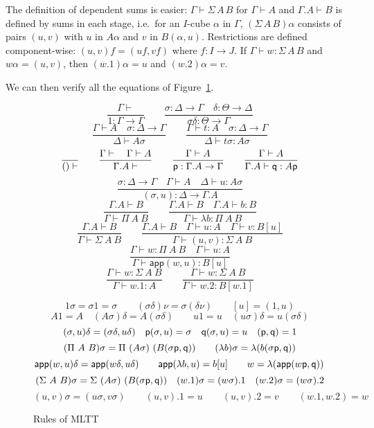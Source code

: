 \documentclass[a4paper,USenglish,draft]{lipics}
\newcommand{\app}{\mathsf{app}}
\newcommand{\pp}{{\sf p}}
\newcommand{\qq}{{\sf q}}
\begin{document}
The definition of dependent sums is easier: $\Gamma\vdash\Sigma\,A\,B$
for $\Gamma \vdash A$ and $\Gamma.A \vdash B$ is defined by sums in
each stage, i.e.\ for an $I$-cube $\alpha$ in $\Gamma$,
$(\Sigma\,A\,B)\alpha$ consists of pairs $(u,v)$ with $u$ in $A
\alpha$ and $v$ in $B (\alpha, u)$.  Restrictions are defined
component-wise: $(u,v)f = (u f, v f)$ where $f \colon I \to J$.  If
$\Gamma \vdash w : \Sigma\,A\,B$ and $w \alpha = (u,v)$, then $(w.1)
\alpha = u$ and $(w.2) \alpha = v$.

We can then verify all the equations of Figure~\ref{MLTT}.
\begin{figure}[t]
\caption{Rules of MLTT\label{MLTT}}
\centering
$$
\frac{\Gamma\vdash}{1:\Gamma\to \Gamma} \qquad
\frac{\sigma:\Delta\to\Gamma \quad \delta:\Theta\to\Delta}
{\sigma\delta:\Theta\to\Gamma}
$$
$$
\frac{\Gamma\vdash A \quad \sigma:\Delta\to\Gamma}{\Delta\vdash
  A\sigma} \qquad
%
\frac{\Gamma\vdash t:A \quad \sigma:\Delta\to\Gamma}{\Delta\vdash
  t\sigma:A\sigma}
$$
$$
\frac{}{()\vdash} \qquad
%
\frac{\Gamma\vdash \quad \Gamma\vdash A}{\Gamma.A\vdash}\qquad
\frac{\Gamma\vdash A}{\pp:\Gamma.A\to\Gamma} \qquad
\frac{\Gamma\vdash A}{\Gamma.A\vdash \qq:A\pp}
$$
$$
\frac{\sigma:\Delta\to\Gamma \quad \Gamma\vdash A \quad \Delta\vdash u:A\sigma}
     {(\sigma,u):\Delta\to\Gamma.A}$$
$$
\frac{\Gamma.A\vdash B}{\Gamma\vdash\Pi~A~B} \qquad
\frac{\Gamma.A\vdash B \quad \Gamma.A\vdash b:B}
     {\Gamma\vdash\lambda b:\Pi~A~B}
$$
$$
\frac{\Gamma.A\vdash B}{\Gamma\vdash\Sigma~A~B} \qquad
\frac{\Gamma.A\vdash B \quad\Gamma\vdash u:A\quad\Gamma\vdash v:B[u]}
     {\Gamma\vdash (u,v):\Sigma~A~B}
$$
$$
\frac{\Gamma\vdash w:\Pi~A~B\quad\Gamma\vdash u:A}
     {\Gamma\vdash \app(w,u):B[u]}
$$
$$
\frac{\Gamma\vdash w:\Sigma~A~B}{\Gamma\vdash w.1 : A}\qquad
\frac{\Gamma\vdash w:\Sigma~A~B}{\Gamma\vdash w.2 : B[w.1]}
$$

\medskip

$$
{1\sigma = \sigma 1 = \sigma}\qquad
{(\sigma\delta)\nu = \sigma(\delta\nu)}\qquad
[u] = (1,u)
$$
$$
{A 1 = A \quad (A \sigma) \delta = A (\sigma \delta) \qquad  u 1 = u \quad
(u \sigma) \delta = u (\sigma \delta)}
$$
$$
{(\sigma,u)\delta = (\sigma\delta,u\delta)} \quad {\pp (\sigma,u) =
  \sigma} \quad {\qq(\sigma,u) = u} \quad (\pp, \qq) = 1
$$
$$
{(\Pi~A~B)\sigma = \Pi~(A\sigma)~(B(\sigma\pp,\qq))} \qquad
{(\lambda b) \sigma = \lambda (b (\sigma \pp, \qq))}
$$
$$
     {\app(w,u)\delta= \app(w\delta,u\delta)}\qquad
     {\app(\lambda b,u)= b[u]}\qquad
     {w = \lambda (\app(w \pp, \qq))} \qquad
$$
$$
(\Sigma~A~B)\sigma = \Sigma~(A\sigma)~(B(\sigma\pp,\qq)) \quad (w.1)
\sigma = (w \sigma).1 \quad (w.2) \sigma = (w \sigma).2
$$
$$
(u, v) \sigma = (u \sigma, v \sigma) \qquad (u,v).1 = u \qquad (u,v).2
= v \qquad (w.1,w.2) = w
$$
\end{figure}
\end{document}
